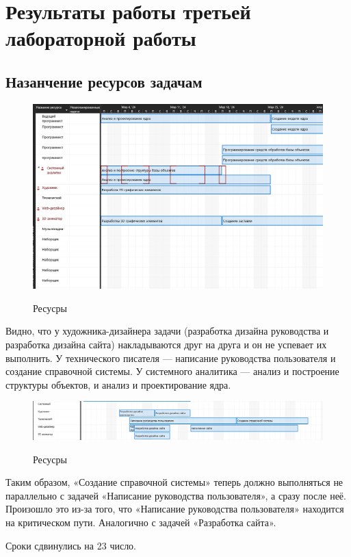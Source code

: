 \section{Результаты работы третьей лабораторной работы}


\subsection{Назанчение ресурсов задачам}

\begin{figure}[ht!]
	\includegraphics[width=0.75\linewidth]{assets/images/conflicts.png}
	\label{fig:r2}
	\caption{Ресусры}
\end{figure}
\FloatBarrier

Видно, что у художника-дизайнера задачи (разработка дизайна руководства и разработка дизайна сайта) накладываются друг на друга и он не успевает их выполнить.
У технического писателя --- написание руководства пользователя и создание справочной системы.
У системного аналитика --- анализ и построение структуры объектов, и анализ и проектирование ядра.

\begin{figure}[ht!]
	\includegraphics[width=0.75\linewidth]{assets/images/conflicts-optimize.png}
	\label{fig:r2}
	\caption{Ресусры}
\end{figure}
\FloatBarrier

Таким образом, «Создание справочной системы» теперь должно выполняться не параллельно с задачей «Написание руководства пользователя», а сразу после неё. Произошло это из-за того, что «Написание руководства пользователя» находится на критическом пути.
Аналогично с задачей «Разработка сайта».

Сроки сдвинулись на 23 число.

